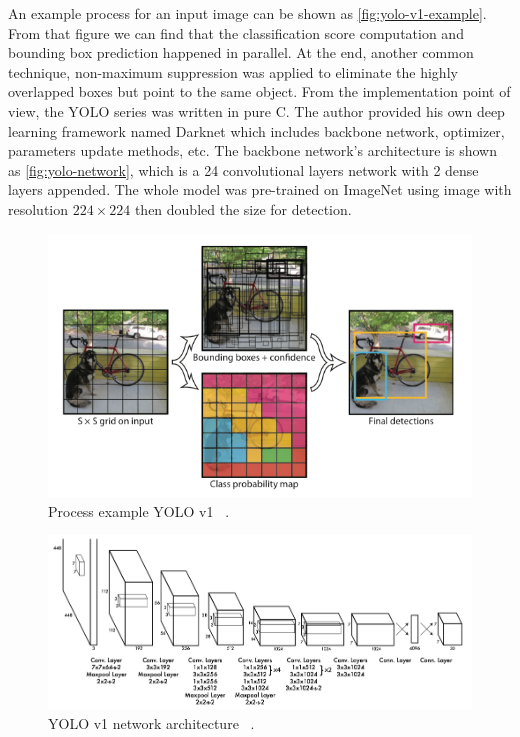 An example process for an input image can be shown as
\autoref{fig:yolo-v1-example}. From that figure we can find that the
classification score computation and bounding box prediction happened in
parallel. At
the end, another common technique, non-maximum
suppression \cite{non-maximum-suppression-paper} was applied to eliminate the
highly overlapped boxes but point to the same object.
From the implementation point of view, the YOLO series was written in pure C. 
The author provided his own deep learning framework
named Darknet \cite{darknet13} which includes
backbone network, optimizer, parameters update
methods, etc. The backbone network's architecture is shown as
\autoref{fig:yolo-network}, which is a 24 convolutional layers network
with 2 dense layers appended. The whole model was pre-trained on ImageNet
using image with resolution $224 \times 224$ then doubled the size for
detection.


\begin{figure}
    \includegraphics[width=\linewidth]{figures/yolo_v1_grid_example.png}
    \caption{Process example YOLO v1 ~\protect\cite{yolov1-paper-2015}.}
    \label{fig:yolo-v1-example}
\end{figure}

\begin{figure}
    \includegraphics[width=\linewidth]{figures/yolo_v1_network_architecture.png}
    \caption{YOLO v1 network architecture ~\protect\cite{yolov1-paper-2015}.}
    \label{fig:yolo-network}
\end{figure}


